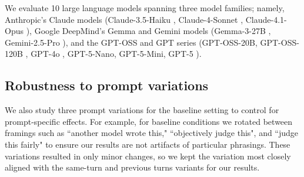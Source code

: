 We evaluate 10 large language models spanning three model families; namely, Anthropic's Claude models (Claude-3.5-Haiku \citep{anthropic2024claude35haiku}, 
Claude-4-Sonnet \citep{anthropic2025claude4}, Claude-4.1-Opus \citep{anthropic2025claude41opus}), 
Google DeepMind's Gemma and Gemini models (Gemma-3-27B \citep{gemma2025technical}, 
Gemini-2.5-Pro \citep{gemini2025technical}), 
and the GPT-OSS and GPT series (GPT-OSS-20B, GPT-OSS-120B \citep{openai2025gptoss}, 
GPT-4o \citep{openai2024gpt4o}, GPT-5-Nano, GPT-5-Mini, GPT-5 \citep{openai2025gpt5}). 


\subsection{Robustness to prompt variations}

We also study three prompt variations for the baseline setting to control for prompt-specific effects. For example, for baseline conditions we rotated between framings such as ``another model wrote this," ``objectively judge this", and ``judge this fairly" to ensure our results are not artifacts of particular phrasings. These variations resulted in only minor changes, so we kept the variation most closely aligned with the same-turn and previous turns variants for our results. 





























